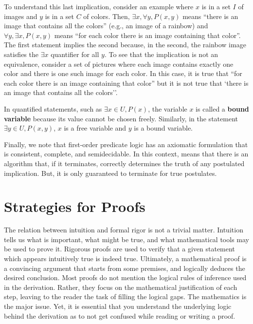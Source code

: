 To understand this last implication, consider an example where $x$ is in a set $I$ of images and $y$ is in a set $C$ of colors.
Then, $\exists x, \forall y, P(x,y)$ means ``there is an image that contains all the colors'' (e.g., an image of a rainbow) and $\forall y, \exists x, P(x,y)$ means ``for each color there is an image containing that color''.
The first statement implies the second because, in the second, the rainbow image satisfies the $\exists x$ quantifier for all $y$.
To see that the implication is not an equivalence, consider a set of pictures where each image contains exactly one color and there is one such image for each color.
In this case, it is true that ``for each color there is an image containing that color'' but it is not true that `there is an image that contains all the colors''.

In quantified statements, such as $\exists x\in U, P(x)$, the variable $x$ is called a \textbf{bound variable} because its value cannot be chosen freely.
Similarly, in the statement $\exists y \in U, P(x,y)$, $x$ is a free variable and $y$ is a bound variable.

Finally, we note that first-order predicate logic has an axiomatic formulation that is consistent, complete, and semidecidable.
In this context,  means that there is an algorithm that, if it terminates, correctly determines the truth of any postulated implication.
But, it is only guaranteed to terminate for true postulates.



\section{Strategies for Proofs}

The relation between intuition and formal rigor is not a trivial matter.
Intuition tells us what is important, what might be true, and what mathematical tools may be used to prove it.
Rigorous proofs are used to verify that a given statement which appears intuitively true is indeed true.
Ultimately, a mathematical proof is a convincing argument that starts from some premises, and logically deduces the desired conclusion.
Most proofs do not mention the logical rules of inference used in the derivation.
Rather, they focus on the mathematical justification of each step, leaving to the reader the task of filling the logical gaps.
The mathematics is the major issue.
Yet, it is essential that you understand the underlying logic behind the derivation as to not get confused while reading or writing a proof.

